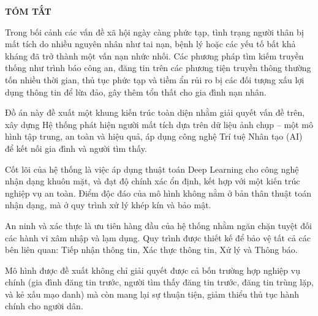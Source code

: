 \documentclass[../DoAn.tex]{subfiles}
\begin{document}
\begin{center}
  \Large{\textbf{TÓM TẮT}}\\
\end{center}
\vspace{1cm}
Trong bối cảnh các vấn đề xã hội ngày càng phức tạp, tình trạng người thân bị mất tích do nhiều nguyên nhân như tai nạn, bệnh lý hoặc các yếu tố bất khả kháng đã trở thành một vấn nạn nhức nhối. Các phương pháp tìm kiếm truyền thống như trình báo công an, đăng tin trên các phương tiện truyền thông thường tốn nhiều thời gian, thủ tục phức tạp và tiềm ẩn rủi ro bị các đối tượng xấu lợi dụng thông tin để lừa đảo, gây thêm tổn thất cho gia đình nạn nhân.

Đồ án này đề xuất một khung kiến trúc toàn diện nhằm giải quyết vấn đề trên, xây dựng Hệ thống phát hiện người mất tích dựa trên dữ liệu ảnh chụp – một mô hình tập trung, an toàn và hiệu quả, áp dụng công nghệ Trí tuệ Nhân tạo (AI) để kết nối gia đình và người tìm thấy.

Cốt lõi của hệ thống là việc áp dụng thuật toán Deep Learning cho công nghệ nhận dạng khuôn mặt, và đạt độ chính xác ổn định, kết hợp với một kiến trúc nghiệp vụ an toàn. Điểm độc đáo của mô hình không nằm ở bản thân thuật toán nhận dạng, mà ở quy trình xử lý khép kín và bảo mật.

An ninh và xác thực là ưu tiên hàng đầu của hệ thống nhằm ngăn chặn tuyệt đối các hành vi xâm nhập và lạm dụng. Quy trình được thiết kế để bảo vệ tất cả các bên liên quan: Tiếp nhận thông tin, Xác thực thông tin, Xử lý và Thông báo.

Mô hình được đề xuất không chỉ giải quyết được cả bốn trường hợp nghiệp vụ chính (gia đình đăng tin trước, người tìm thấy đăng tin trước, đăng tin trùng lặp, và kẻ xấu mạo danh) mà còn mang lại sự thuận tiện, giảm thiểu thủ tục hành chính cho người dân.
\begin{flushright}
  \begin{tabular}{@{}c@{}}
  \end{tabular}
\end{flushright}
\end{document}
